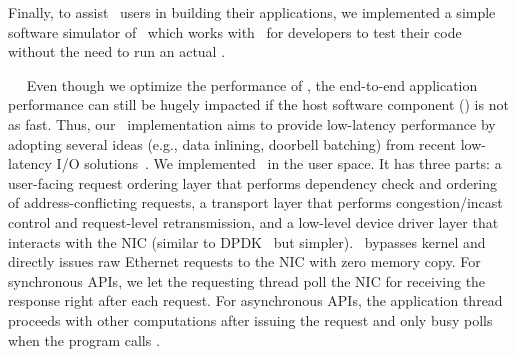 Finally, to assist \sys\ users in building their applications, we implemented a simple software simulator
of \sysboard\ which works with \syslib\ for developers to test their code without the need to run an actual \sysboard.

~~
Even though we optimize the performance of \sysboard, the end-to-end application performance can still be hugely impacted if the host software component (\syslib) is not as fast.
Thus, our \syslib\ implementation aims to provide low-latency performance by adopting several ideas (e.g., data inlining, doorbell batching) from recent low-latency I/O solutions~\cite{ERPC,Kalia14-RDMAKV,Kalia16-ATC,Tsai17-SOSP,Shinjuku,Shenango,demikernel-sosp21}.
We implemented \syslib\ in the user space. 
It has three parts: a user-facing request ordering layer that performs dependency check and ordering of address-conflicting requests,
a transport layer that performs congestion/incast control and request-level retransmission, 
and a low-level device driver layer that interacts with the NIC (similar to DPDK~\cite{DPDK} but simpler).
\syslib\ bypasses kernel and directly issues raw Ethernet requests to the NIC with zero memory copy.
For synchronous APIs, we let the requesting thread poll the NIC for receiving the response right after each request.
For asynchronous APIs, the application thread proceeds with other computations after issuing the request and only busy polls when the program calls \poll.
